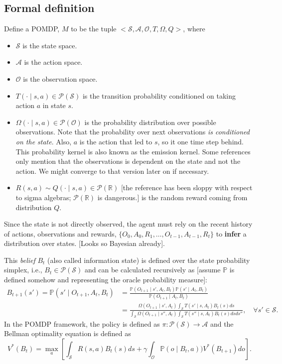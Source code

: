 \documentclass[a4paper]{article}
\theoremstyle{definition}
\newcommand{\cA}{\mathcal{A}}
\newcommand{\cO}{\mathcal{O}}
\newcommand{\cS}{\mathcal{S}}
\newcommand{\cP}{\mathcal{P}}
\newcommand{\R}{\mathbb{R}}
\renewcommand{\P}{\mathbb{P}}
\begin{document}
\subsection{Formal definition}
Define a POMDP, $M$ to be the tuple  $<\cS, \cA, \cO, T, \Omega, Q>$, where
\begin{itemize}
    \item $\cS$ is the state space.
    \item $\cA$ is the action space.
    \item $\cO$ is the observation space.
    \item $T(\cdot \mid s, a) \in \cP(\cS)$ is the transition probability conditioned on taking action $a$ in state $s$.
    \item $\Omega(\cdot \mid s, a) \in \cP(\cO)$ is the probability distribution over possible observations. Note that the probability over next observations \emph{is conditioned on the state}. Also, $a$ is the action that led to $s$, so it one time step behind. This probability kernel is also known as the emission kernel. Some references only mention that the observations is dependent on the state and not the action. We might converge to that version later on if necessary.
    
    \item $R(s, a) \sim Q(\cdot \mid s, a) \in \cP(\R)$ [the reference has been sloppy with respect to sigma algebras; $\cP(\R)$ is dangerous.] is the random reward coming from distribution $Q$.
\end{itemize}
Since the state is not directly observed, the agent must rely on the recent history of actions, observations and rewards, $\{O_0, A_0, R_1, \dots, O_{t - 1}, A_{t - 1}, R_t\}$ to \textbf{infer} a distribution over states. [Looks so Bayesian already].

This \emph{belief} $B_t$ (also called information state) is defined over the state probability simplex, i.e., $B_t \in \cP(\cS)$ and can be calculated recursively as [assume $\P$ is defined somehow and representing the oracle probability measure]:
\begin{align}
B_{t + 1}\left(s'\right) = \P(s' \mid O_{t + 1}, A_t, B_t) & = \frac{\P(O_{t + 1} \mid s', A_t, B_t)\P(s' \mid A_t, B_t)}{\P(O_{t + 1} \mid A_t, B_t)} \label{eq:bayes_pomdp}\\
     &= \frac{\Omega(O_{t + 1} \mid s', A_t)\int_{\cS}T(s' \mid s, A_t)B_t(s)ds}{\int_{\cS}\Omega(O_{t + 1} \mid s'', A_t)\int_{\cS}T(s'' \mid s, A_t)B_t(s)dsds''}, \quad \forall s' \in \cS. \nonumber
\end{align}
In the POMDP framework, the policy is defined as $\pi: \cP(\cS) \to \cA$ and the Bellman optimality equation is defined as
\begin{equation*}
    V^*(B_t) = \max_a \left[\int_{\cS}R(s, a)B_t(s)ds + \gamma\int_\cO \P(o \mid B_t, a))V^*(B_{t + 1})do \right].
\end{equation*}
%
\end{document}
